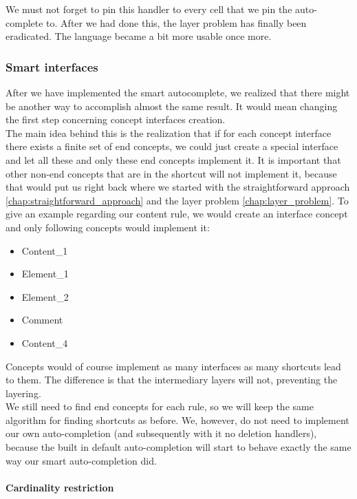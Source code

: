 We must not forget to pin this handler to every cell that we pin the auto-complete to. After we had done this, the layer problem has finally been eradicated. The language became a bit more usable once more.

\subsubsection{Smart interfaces}

After we have implemented the smart autocomplete, we realized that there might be another way to accomplish almost the same result. It would mean changing the first step concerning concept interfaces creation. 
\\

The main idea behind this is the realization that if for each concept interface there exists a finite set of end concepts, we could just create a special interface and let all these and only these end concepts implement it. It is important that other non-end concepts that are in the shortcut will not implement it, because that would put us right back where we started with the straightforward approach \ref{chap:straightforward_approach} and the layer problem \ref{chap:layer_problem}. To give an example regarding our content rule, we would create an  interface concept and only following concepts would implement it:

\begin{itemize}
	\setlength\itemsep{0pt}
	\item Content{\_}1
	\item Element{\_}1
	\item Element{\_}2
	\item Comment
	\item Content{\_}4
\end{itemize}

Concepts would of course implement as many interfaces as many shortcuts lead to them. The difference is that the intermediary layers will not, preventing the layering.
\\

We still need to find end concepts for each rule, so we will keep the same algorithm for finding shortcuts as before. We, however, do not need to implement our own auto-completion (and subsequently with it no deletion handlers), because the built in default auto-completion will start to behave exactly the same way our smart auto-completion did.

\paragraph{Cardinality restriction}

